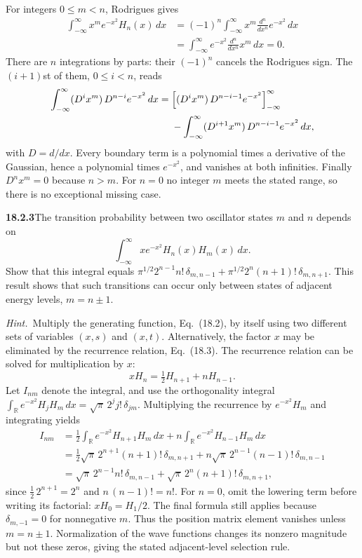 For integers $0\le m<n$, Rodrigues gives
\begin{align*}
\int_{-\infty}^{\infty}x^me^{-x^2}H_n(x)\,dx
 &=(-1)^n\int_{-\infty}^{\infty}x^m
           \frac{d^n}{dx^n}e^{-x^2}\,dx\\
 &=\int_{-\infty}^{\infty}e^{-x^2}
           \frac{d^n}{dx^n}x^m\,dx=\boxed{0}.
\end{align*}
There are $n$ integrations by parts: their $(-1)^n$ cancels the
Rodrigues sign.  The $(i+1)$st of them, $0\le i<n$, reads
\begin{align*}
\int_{-\infty}^{\infty}(D^ix^m)\,D^{n-i}e^{-x^2}\,dx
 ={}&\Bigl[(D^ix^m)\,D^{n-i-1}e^{-x^2}\Bigr]_{-\infty}^{\infty}\\
 &-\int_{-\infty}^{\infty}(D^{i+1}x^m)\,D^{n-i-1}e^{-x^2}\,dx,
\end{align*}
with $D=d/dx$.  Every boundary term is a polynomial times a derivative
of the Gaussian, hence a polynomial times $e^{-x^2}$, and vanishes at
both infinities.  Finally
$D^nx^m=0$ because $n>m$.  For $n=0$ no integer $m$ meets the stated
range, so there is no exceptional missing case.

\par\bigskip
\noindent\textbf{18.2.3}\quad The transition probability between two
oscillator states $m$ and $n$ depends on
\[
\int_{-\infty}^{\infty}xe^{-x^{2}}H_{n}(x)H_{m}(x)\,dx.
\]
Show that this integral equals
$\pi^{1/2}2^{n-1}n!\,\delta_{m,n-1}+\pi^{1/2}2^{n}(n+1)!\,
\delta_{m,n+1}$. This result shows that such transitions can occur
only between states of adjacent energy levels, $m=n\pm1$.
\par\emph{Hint.}~Multiply the generating function, Eq.~(18.2), by
itself using two different sets of variables $(x,s)$ and $(x,t)$.
Alternatively, the factor $x$ may be eliminated by the recurrence
relation, Eq.~(18.3).
\solution
The recurrence relation can be solved for multiplication by $x$:
\[
xH_n=\tfrac12H_{n+1}+nH_{n-1}.
\]
Let $I_{nm}$ denote the integral, and use the orthogonality integral
$\int_{\mathbb R}e^{-x^2}H_jH_m\,dx=\sqrt\pi\,2^jj!\,\delta_{jm}$.
Multiplying the recurrence by $e^{-x^2}H_m$ and integrating yields
\begin{align*}
I_{nm}
 &=\tfrac12\int_{\mathbb R}e^{-x^2}H_{n+1}H_m\,dx
   +n\int_{\mathbb R}e^{-x^2}H_{n-1}H_m\,dx\\
 &=\tfrac12\sqrt\pi\,2^{n+1}(n+1)!\,\delta_{m,n+1}
   +n\sqrt\pi\,2^{n-1}(n-1)!\,\delta_{m,n-1}\\
 &=\boxed{\sqrt\pi\,2^{n-1}n!\,\delta_{m,n-1}
   +\sqrt\pi\,2^n(n+1)!\,\delta_{m,n+1}},
\end{align*}
since $\tfrac12\,2^{n+1}=2^n$ and $n\,(n-1)!=n!$.
For $n=0$, omit the lowering term before writing its factorial:
$xH_0=H_1/2$.  The final formula still applies because
$\delta_{m,-1}=0$ for nonnegative $m$.
Thus the position matrix element vanishes unless $m=n\pm1$.
Normalization of the wave functions changes its nonzero magnitude
but not these zeros, giving the stated adjacent-level selection rule.

